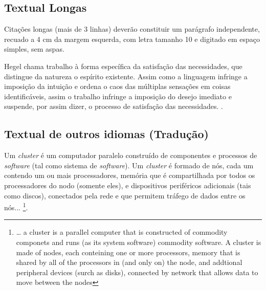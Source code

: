 \subsection{\hspace{-0.3cm}Textual Longas}

Citações longas (mais de 3 linhas) deverão constituir um parágrafo independente, recuado a 4 cm da margem esquerda, 
com letra tamanho 10 e digitado em espaço simples, sem aspas.
\begin{citacaodireta}
Hegel chama trabalho à forma específica da satisfação das necessidades, que
distingue da natureza o espírito existente. Assim como a linguagem infringe
a imposição da intuição e ordena o caos das múltiplas sensações em coisas
identificáveis, assim o trabalho infringe a imposição do \hspace{0.1cm}desejo \hspace{0.1cm}imediato \hspace{0.1cm}e
suspende, por assim dizer, o processo de satisfação das necessidades.
\cite[25]{habermas}.
\end{citacaodireta}



\subsection{\hspace{-0.3cm}Textual de outros idiomas (Tradução)}

\begin{citacaodireta} 
Um \textit{cluster} é um computador paralelo construído de componentes e processos de \textit{software} (tal como sistema de \textit{software}). 
Um \textit{cluster} é formado de nós, cada um contendo um ou mais processadores, memória que é compartilhada por todos os processadores do nodo 
(somente eles), e dispositivos periféricos adicionais (tais como discos), conectados pela rede e que permitem tráfego de dados entre os nós...
\cite[p. 10, tradução nossa]{groupp}\footnote {  … a cluster is a parallel computer that is constructed of commodity  componets and runs 
(as its system software) commodity software. A cluster is made of nodes, each conteining one or more processors, memory that is  shared 
by all of the processors in (and only on) the node, and addtional peripheral devices (surch as disks),
 connected by network that allows data to move between the nodes}.

\end{citacaodireta}
 
